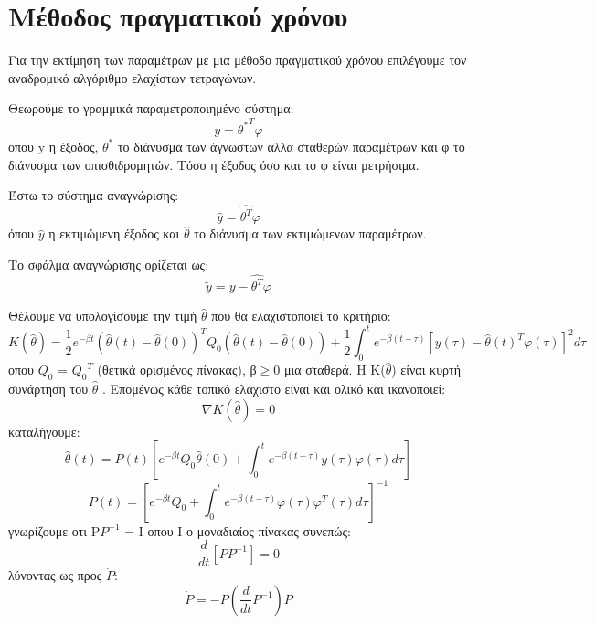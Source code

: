 \documentclass{article}
\begin{document}
\section*{Μέθοδος πραγματικού χρόνου}
Για την εκτίμηση των παραμέτρων με μια μέθοδο πραγματικού χρόνου επιλέγουμε τον αναδρομικό αλγόριθμο ελαχίστων τετραγώνων.
\par Θεωρούμε το γραμμικά παραμετροποιημένο σύστημα:
\begin{equation*}
y = {θ^*}^Tφ
\end{equation*}
οπου y η έξοδος, ${θ^*}$ το διάνυσμα των άγνωστων αλλα σταθερών παραμέτρων και φ το διάνυσμα των οπισθιδρομητών. Τόσο η έξοδος όσο και το φ είναι μετρήσιμα. \par Έστω το σύστημα αναγνώρισης:
\begin{equation*}
\hat{y} = \hat{{θ}^T}φ 
\end{equation*}
όπου $\hat{y}$ η εκτιμώμενη έξοδος και $\hat{θ}$ το διάνυσμα των εκτιμώμενων παραμέτρων.
\par Το σφάλμα αναγνώρισης ορίζεται ως:
\begin{equation*}
\tilde{y} = y - \hat{{θ}^T}φ 
\end{equation*}
\par Θέλουμε να υπολογίσουμε την τιμή $\hat{θ}$ που θα ελαχιστοποιεί το κριτήριο:
\begin{equation*}
K(\hat{θ}) = \frac{1}{2}e^{-βt}(\hat{θ}(t) - \hat{θ}(0))^T Q_0 (\hat{θ}(t) - \hat{θ}(0)) + \frac{1}{2} \int_{0}^{t} e^{-β(t-τ)}[y(τ) - \hat{θ}(t)^Tφ(τ)]^2 dτ
\end{equation*}
οπου $Q_0$ = ${Q_0}^T$ (θετικά ορισμένος πίνακας), β$\geq$0 μια σταθερά. Η Κ($\hat{θ}$) είναι κυρτή συνάρτηση του $\hat{θ}$ . Επομένως κάθε τοπικό ελάχιστο είναι και ολικό και ικανοποιεί:
\begin{equation*}
\nabla{K(\hat{θ})} = 0
\end{equation*}
καταλήγουμε:
\begin{equation*}
\hat{θ}(t) = P(t) [ e^{-βt} Q_0 \hat{θ}(0) + \int_{0}^{t} e^{-β(t-τ)}y(τ)φ(τ) dτ]
\end{equation*}
\begin{equation*}
P(t) = [ e^{-βt} Q_0 + \int_{0}^{t} e^{-β(t-τ)}φ(τ)φ^T(τ) dτ]^{-1}
\end{equation*}
γνωρίζουμε οτι Ρ$P^{-1}$ = Ι οπου Ι ο μοναδιαίος πίνακας συνεπώς:
\begin{equation*}
\frac{d}{dt}[PP^{-1}] = 0
\end{equation*}
λύνοντας ως προς $\dot{P}$:
\begin{equation*}
\dot{P} = -P(\frac{d}{dt}P^{-1})P
\end{equation*}
\end{document}
